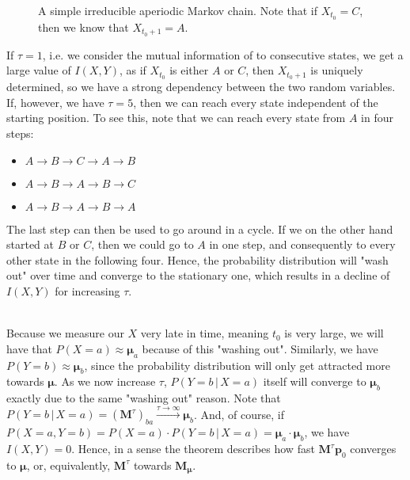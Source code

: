 \documentclass[../../main.tex]{subfiles}
\begin{document}
    \begin{figure}[h]
    \center
    \caption{A simple irreducible aperiodic Markov chain. Note that if $X_{t_0} = C$, then we know that $X_{t_0+1} = A$.}
    \label{fig:2_markov_chain}
    \end{figure}

    \noindent
    If $\tau = 1$, i.e. we consider the mutual information of to consecutive states, we get a large value of $I(X, Y)$, as if $X_{t_0}$ is either $A$ or $C$, then $X_{t_0+1}$ is uniquely determined, so we have a strong dependency between the two random variables. If, however, we have $\tau = 5$, then we can reach every state independent of the starting position. To see this, note that we can reach every state from $A$ in four steps:
    \begin{itemize}
        \item $A \rightarrow B \rightarrow C \rightarrow A \rightarrow B$
        \item $A \rightarrow B \rightarrow A \rightarrow B \rightarrow C$
        \item $A \rightarrow B \rightarrow A \rightarrow B \rightarrow A$
    \end{itemize}
    The last step can then be used to go around in a cycle. If we on the other hand started at $B$ or $C$, then we could go to $A$ in one step, and consequently to every other state in the following four. Hence, the probability distribution will "wash out" over time and converge to the stationary one, which results in a decline of $I(X, Y)$ for increasing $\tau$.
    
    ~\\
    Because we measure our $X$ very late in time, meaning $t_0$ is very large, we will have that $P(X = a) \approx \boldsymbol{\mu}_a$ because of this "washing out". Similarly, we have $P(Y = b) \approx \boldsymbol{\mu}_b$, since the probability distribution will only get attracted more towards $\boldsymbol{\mu}$. As we now increase $\tau$, $P(Y = b \,|\, X = a)$ itself will converge to $\boldsymbol{\mu}_b$ exactly due to the same "washing out" reason. Note that $P(Y = b \,|\, X = a) = (\boldsymbol{M}^{\tau})_{ba} \xrightarrow{\tau \to \infty}  \boldsymbol{\mu}_b$. And, of course, if $P(X = a, Y = b) = P(X = a) \cdot P(Y = b \,|\, X = a) = \boldsymbol{\mu}_a \cdot \boldsymbol{\mu}_b$, we have $I(X, Y) = 0$. Hence, in a sense the theorem describes how fast $\boldsymbol{M}^{\tau}\bm{p}_0$ converges to $\boldsymbol{\mu}$, or, equivalently, $\boldsymbol{M}^{\tau}$ towards $\boldsymbol{M}_{\boldsymbol{\mu}}$.
\end{document}
